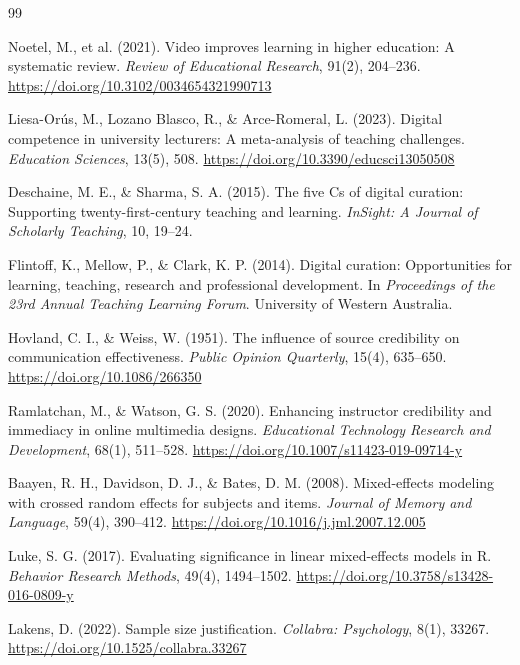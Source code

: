 \documentclass[11pt]{ltjarticle}
\begin{document}
\begin{thebibliography}{99}

Noetel, M., et al. (2021).
Video improves learning in higher education:
A systematic review.
\textit{Review of Educational Research},
91(2), 204--236.
\url{https://doi.org/10.3102/0034654321990713}

Liesa-Orús, M., Lozano Blasco, R.,
\& Arce-Romeral, L. (2023).
Digital competence in university lecturers:
A meta-analysis of teaching challenges.
\textit{Education Sciences}, 13(5), 508.
\url{https://doi.org/10.3390/educsci13050508}

Deschaine, M. E., \& Sharma, S. A. (2015).
The five Cs of digital curation:
Supporting twenty-first-century teaching
and learning.
\textit{InSight: A Journal of Scholarly Teaching},
10, 19--24.

Flintoff, K., Mellow, P.,
\& Clark, K. P. (2014).
Digital curation: Opportunities for learning,
teaching, research and professional development.
In \textit{Proceedings of the 23rd Annual
Teaching Learning Forum}.
University of Western Australia.

Hovland, C. I., \& Weiss, W. (1951).
The influence of source credibility on
communication effectiveness.
\textit{Public Opinion Quarterly},
15(4), 635--650.
\url{https://doi.org/10.1086/266350}

Ramlatchan, M., \& Watson, G. S. (2020).
Enhancing instructor credibility and
immediacy in online multimedia designs.
\textit{Educational Technology Research
and Development}, 68(1), 511--528.
\url{https://doi.org/10.1007/s11423-019-09714-y}

Baayen, R. H., Davidson, D. J.,
\& Bates, D. M. (2008).
Mixed-effects modeling with crossed
random effects for subjects and items.
\textit{Journal of Memory and Language},
59(4), 390--412.
\url{https://doi.org/10.1016/j.jml.2007.12.005}

Luke, S. G. (2017).
Evaluating significance in linear
mixed-effects models in R.
\textit{Behavior Research Methods},
49(4), 1494--1502.
\url{https://doi.org/10.3758/s13428-016-0809-y}

Lakens, D. (2022).
Sample size justification.
\textit{Collabra: Psychology}, 8(1), 33267.
\url{https://doi.org/10.1525/collabra.33267}

\end{thebibliography}
\end{document}
